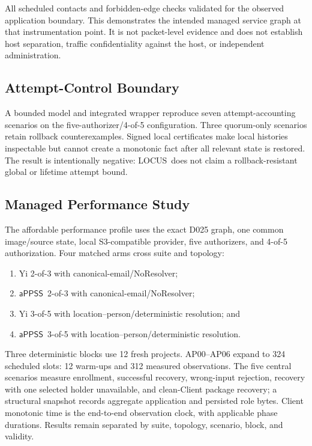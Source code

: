 \documentclass[sigconf,anonymous]{acmart}
\newcommand{\LOCUS}{\textsf{LOCUS}}
\newcommand{\APPSS}{\ensuremath{\mathsf{aPPSS}}}
\begin{document}
All scheduled contacts and forbidden-edge checks validated for the observed
application boundary. This demonstrates the intended managed service graph at
that instrumentation point. It is not packet-level evidence and does not
establish host separation, traffic confidentiality against the host, or
independent administration.

\subsection{Attempt-Control Boundary}

A bounded model and integrated wrapper reproduce seven attempt-accounting
scenarios on the five-authorizer/4-of-5 configuration. Three quorum-only
scenarios retain rollback counterexamples. Signed local certificates make
local histories inspectable but cannot create a monotonic fact after all
relevant state is restored. The result is intentionally negative: \LOCUS\
does not claim a rollback-resistant global or lifetime attempt bound.

\subsection{Managed Performance Study}

The affordable performance profile uses the exact D025 graph, one common
image/source state, local S3-compatible provider, five authorizers, and
4-of-5 authorization. Four matched arms cross suite and topology:
\begin{enumerate}
  \item Yi 2-of-3 with canonical-email/NoResolver;
  \item \APPSS\ 2-of-3 with canonical-email/NoResolver;
  \item Yi 3-of-5 with location--person/deterministic resolution; and
  \item \APPSS\ 3-of-5 with location--person/deterministic resolution.
\end{enumerate}
Three deterministic blocks use 12 fresh projects. AP00--AP06 expand to 324
scheduled slots: 12 warm-ups and 312 measured observations. The five central
scenarios measure enrollment, successful recovery, wrong-input rejection,
recovery with one selected holder unavailable, and clean-Client package
recovery; a structural snapshot records aggregate application and persisted
role bytes. Client monotonic time is the end-to-end observation clock, with
applicable phase durations. Results remain separated by suite, topology,
scenario, block, and validity.
\end{document}

